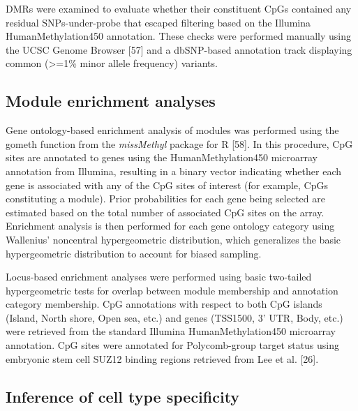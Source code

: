 \documentclass[]{article}
\theoremstyle{definition}
\theoremstyle{definition}
\theoremstyle{definition}
\theoremstyle{remark}
\begin{document}
DMRs were examined to evaluate whether their constituent CpGs contained
any residual SNPs-under-probe that escaped filtering based on the
Illumina HumanMethylation450 annotation. These checks were performed
manually using the UCSC Genome Browser {[}57{]} and a dbSNP-based
annotation track displaying common (\textgreater{}=1\% minor allele
frequency) variants.

\subsection{Module enrichment
analyses}\label{module-enrichment-analyses}

Gene ontology-based enrichment analysis of modules was performed using
the gometh function from the \emph{missMethyl} package for R {[}58{]}.
In this procedure, CpG sites are annotated to genes using the
HumanMethylation450 microarray annotation from Illumina, resulting in a
binary vector indicating whether each gene is associated with any of the
CpG sites of interest (for example, CpGs constituting a module). Prior
probabilities for each gene being selected are estimated based on the
total number of associated CpG sites on the array. Enrichment analysis
is then performed for each gene ontology category using Wallenius'
noncentral hypergeometric distribution, which generalizes the basic
hypergeometric distribution to account for biased sampling.

Locus-based enrichment analyses were performed using basic two-tailed
hypergeometric tests for overlap between module membership and
annotation category membership. CpG annotations with respect to both CpG
islands (Island, North shore, Open sea, etc.) and genes (TSS1500, 3'
UTR, Body, etc.) were retrieved from the standard Illumina
HumanMethylation450 microarray annotation. CpG sites were annotated for
Polycomb-group target status using embryonic stem cell SUZ12 binding
regions retrieved from Lee et al. {[}26{]}.

\subsection{Inference of cell type
specificity}\label{inference-of-cell-type-specificity}
\end{document}
